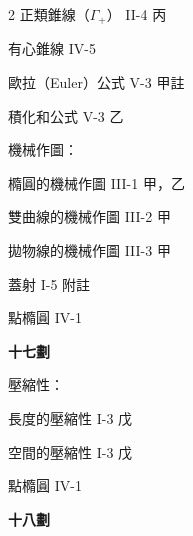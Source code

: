 \begin{multicols}{2}
\noindent\hspace*{1.5em} 正類錐線（$\Gamma_+$） \hfill II-4 丙\par
\noindent\hspace*{1.5em} 有心錐線 \hfill IV-5\par
\noindent 歐拉（Euler）公式 \hfill V-3 甲註\par
\noindent 積化和公式 \hfill V-3 乙\par
\noindent 機械作圖：\par
\noindent\hspace*{1.5em} 橢圓的機械作圖 \hfill III-1 甲，乙\par
\noindent\hspace*{1.5em} 雙曲線的機械作圖 \hfill III-2 甲\par
\noindent\hspace*{1.5em} 拋物線的機械作圖 \hfill III-3 甲\par
\noindent 蓋射 \hfill I-5 附註\par
\noindent 點橢圓 \hfill IV-1\par

\vspace{0.8em}
\begin{center}
\textbf{\large 十七劃}
\end{center}

\noindent 壓縮性：\par
\noindent\hspace*{1.5em} 長度的壓縮性 \hfill I-3 戊\par
\noindent\hspace*{1.5em} 空間的壓縮性 \hfill I-3 戊\par
\noindent 點橢圓 \hfill IV-1\par

\vspace{0.8em}
\begin{center}
\textbf{\large 十八劃}
\end{center}


\end{multicols}
